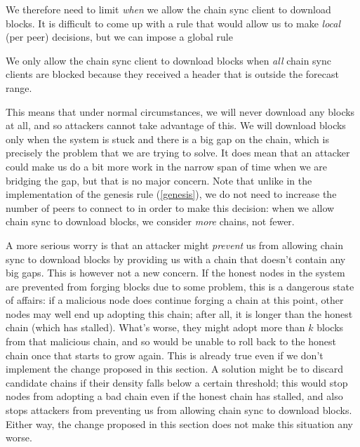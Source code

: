 We therefore need to limit \emph{when} we allow the chain sync client to
download blocks. It is difficult to come up with a rule that would allow us to
make \emph{local} (per peer) decisions, but we can impose a global rule

\begin{definition}
\label{low-density:pre-genesis-jump-condition}
We only allow the chain sync client to download blocks when \emph{all} chain
sync clients are blocked because they received a header that is outside the
forecast range.
\end{definition}

This means that under normal circumstances, we will never download any blocks at
all, and so attackers cannot take advantage of this. We will download blocks
only when the system is stuck and there is a big gap on the chain, which is
precisely the problem that we are trying to solve. It does mean that an attacker
could make us do a bit more work in the narrow span of time when we are bridging
the gap, but that is no major concern. Note that unlike in the implementation of
the genesis rule (\cref{genesis}), we do not need to increase the number of
peers to connect to in order to make this decision: when we allow chain sync to
download blocks, we consider \emph{more} chains, not fewer.

A more serious worry is that an attacker might \emph{prevent} us from allowing
chain sync to download blocks by providing us with a chain that doesn't contain
any big gaps. This is however not a new concern. If the honest nodes in the
system are prevented from forging blocks due to some problem, this is a
dangerous state of affairs: if a malicious node does continue forging a chain at
this point, other nodes may well end up adopting this chain; after all, it is
longer than the honest chain (which has stalled). What's worse, they might adopt
more than $k$ blocks from that malicious chain, and so would be unable to roll
back to the honest chain once that starts to grow again. This is already true
even if we don't implement the change proposed in this section. A solution might
be to discard candidate chains if their density falls below a certain threshold;
this would stop nodes from adopting a bad chain even if the honest chain has
stalled, and also stops attackers from preventing us from allowing chain sync to
download blocks. Either way, the change proposed in this section does not make
this situation any worse.

